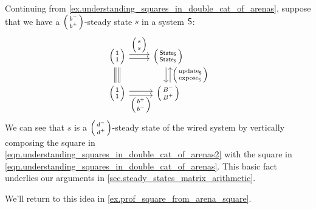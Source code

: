 \documentclass[DynamicalBook]{subfiles}
\begin{document}
\begin{example}\label{ex.understanding_squares_in_double_cat_of_arenas2}
  Continuing from \cref{ex.understanding_squares_in_double_cat_of_arenas},
  suppose that we have a $\lens{b^-}{b^+}$-steady state $s$ in a system $\mathsf{S}$:
  \begin{equation}\label{eqn.understanding_squares_in_double_cat_of_arenas2}
    \begin{tikzcd}
      \lens{\ord{1}}{\ord{1}} \ar[r, shift left, "\lens{s}{s}"] \ar[r, shift
      right] \ar[d, shift right, equals] \ar[d, shift left, equals] &
      \lens{\State{S}}{\State{S}} \ar[d, shift left, leftarrow,
      "\lens{\update{S}}{\expose{S}}"] \ar[d, shift right]\\
      \lens{\ord{1}}{\ord{1}} \ar[r, shift right, "\lens{b^+}{b^-}"'] \ar[r,
      shift left] & \lens{B^-}{B^+}
    \end{tikzcd}
  \end{equation}
  We can see that $s$ is a $\lens{d^-}{d^+}$-steady state of the wired system by
  vertically composing the square in
  \cref{eqn.understanding_squares_in_double_cat_of_arenas2} with the square in
  \cref{eqn.understanding_squares_in_double_cat_of_arenas}. This basic fact
  underlies our arguments in \cref{sec.steady_states_matrix_arithmetic}. 

We'll return to this idea in \cref{ex.prof_square_from_arena_square}.
\end{example}
\end{document}
